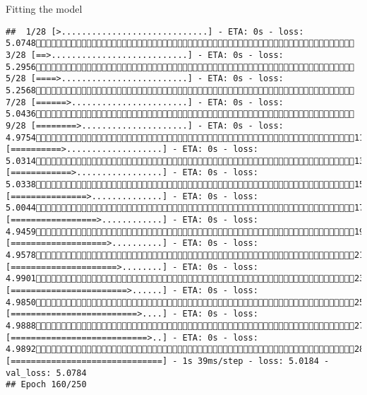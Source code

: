 \documentclass[
  ignorenonframetext,
]{beamer}
\begin{document}
\begin{frame}[fragile]{Fitting the model}
\begin{verbatim}
##  1/28 [>.............................] - ETA: 0s - loss: 5.0748 3/28 [==>...........................] - ETA: 0s - loss: 5.2956 5/28 [====>.........................] - ETA: 0s - loss: 5.2568 7/28 [======>.......................] - ETA: 0s - loss: 5.0436 9/28 [========>.....................] - ETA: 0s - loss: 4.975411/28 [==========>...................] - ETA: 0s - loss: 5.031413/28 [============>.................] - ETA: 0s - loss: 5.033815/28 [===============>..............] - ETA: 0s - loss: 5.004417/28 [=================>............] - ETA: 0s - loss: 4.945919/28 [===================>..........] - ETA: 0s - loss: 4.957821/28 [=====================>........] - ETA: 0s - loss: 4.990123/28 [=======================>......] - ETA: 0s - loss: 4.985025/28 [=========================>....] - ETA: 0s - loss: 4.988827/28 [===========================>..] - ETA: 0s - loss: 4.989228/28 [==============================] - 1s 39ms/step - loss: 5.0184 - val_loss: 5.0784
## Epoch 160/250

\end{verbatim}
\end{frame}
\end{document}
